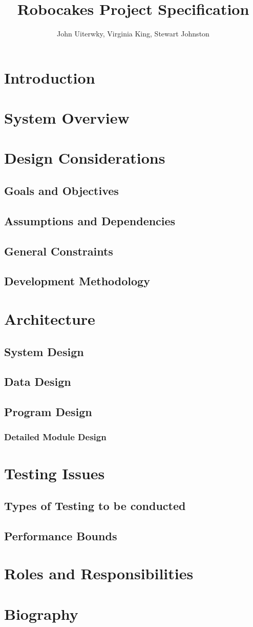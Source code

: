 \documentclass[a4paper]{article}
\begin{document}
\title{Robocakes Project Specification}
\author{John Uiterwky, Virginia King, Stewart Johnston}

\maketitle

\section{Introduction}
\section{System Overview}
\section{Design Considerations}
\subsection{Goals and Objectives}
\subsection{Assumptions and Dependencies}
\subsection{General Constraints}
\subsection{Development Methodology}
\section{Architecture}
\subsection{System Design}
\subsection{Data Design}
\subsection{Program Design}
\subsubsection{Detailed Module Design}
\section{Testing Issues}
\subsection{Types of Testing to be conducted}
\subsection{Performance Bounds}
\section{Roles and Responsibilities}
\section{Biography}
\end{document}
